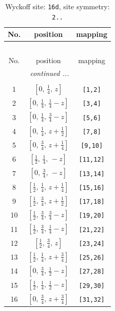 \documentclass[fleqn,8pt]{jsarticle}
\begin{document}
\renewcommand{\arraystretch}{1.2}
\begin{longtable}{ccc}
\caption{Wyckoff site: {\tt 16d}, site symmetry: {\tt 2..}}
 \\
 \hline \hline
No. & position & mapping \\ \hline \endfirsthead

\multicolumn{2}{l}{\tablename\ \thetable{}} \\
 \hline \hline
No. & position & mapping \\ \hline \endhead

 \hline \hline
\multicolumn{2}{r}{\footnotesize\it continued ...} \\ \endfoot

 \hline \hline
\multicolumn{2}{r}{} \\ \endlastfoot

1 & $\left[ 0,\, \frac{1}{4},\, z \right]$ & {\tt [1,2]} \\ \hline
2 & $\left[ 0,\, \frac{1}{4},\, \frac{1}{4} - z \right]$ & {\tt [3,4]} \\ \hline
3 & $\left[ 0,\, \frac{1}{4},\, \frac{3}{4} - z \right]$ & {\tt [5,6]} \\ \hline
4 & $\left[ 0,\, \frac{1}{4},\, z + \frac{1}{2} \right]$ & {\tt [7,8]} \\ \hline
5 & $\left[ 0,\, \frac{3}{4},\, z + \frac{1}{4} \right]$ & {\tt [9,10]} \\ \hline
6 & $\left[ \frac{1}{2},\, \frac{1}{4},\, - z \right]$ & {\tt [11,12]} \\ \hline
7 & $\left[ 0,\, \frac{3}{4},\, - z \right]$ & {\tt [13,14]} \\ \hline
8 & $\left[ \frac{1}{2},\, \frac{1}{4},\, z + \frac{1}{4} \right]$ & {\tt [15,16]} \\ \hline
9 & $\left[ \frac{1}{2},\, \frac{3}{4},\, z + \frac{1}{2} \right]$ & {\tt [17,18]} \\ \hline
10 & $\left[ \frac{1}{2},\, \frac{3}{4},\, \frac{3}{4} - z \right]$ & {\tt [19,20]} \\ \hline
11 & $\left[ \frac{1}{2},\, \frac{3}{4},\, \frac{1}{4} - z \right]$ & {\tt [21,22]} \\ \hline
12 & $\left[ \frac{1}{2},\, \frac{3}{4},\, z \right]$ & {\tt [23,24]} \\ \hline
13 & $\left[ \frac{1}{2},\, \frac{1}{4},\, z + \frac{3}{4} \right]$ & {\tt [25,26]} \\ \hline
14 & $\left[ 0,\, \frac{3}{4},\, \frac{1}{2} - z \right]$ & {\tt [27,28]} \\ \hline
15 & $\left[ \frac{1}{2},\, \frac{1}{4},\, \frac{1}{2} - z \right]$ & {\tt [29,30]} \\ \hline
16 & $\left[ 0,\, \frac{3}{4},\, z + \frac{3}{4} \right]$ & {\tt [31,32]} \\
\end{longtable}
\end{document}
